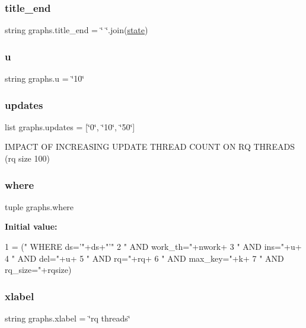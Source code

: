 \subsubsection{\texorpdfstring{title\+\_\+end}{title\_end}}
{\footnotesize\ttfamily string graphs.\+title\+\_\+end = \char`\"{} \char`\"{}.join(\hyperlink{namespacegraphs_a7e28b4b5f2a57b0c7edebb674233cf1e}{state})}

\mbox{\label{namespacegraphs_aebc3e1c4f83749bafa0b9caba4731c50}} 
\subsubsection{\texorpdfstring{u}{u}}
{\footnotesize\ttfamily string graphs.\+u = \char`\"{}10\char`\"{}}

\mbox{\label{namespacegraphs_a222bd6a58314240f5bd2dea29ef99ea2}} 
\subsubsection{\texorpdfstring{updates}{updates}}
{\footnotesize\ttfamily list graphs.\+updates = \mbox{[}\char`\"{}0\char`\"{}, \char`\"{}10\char`\"{}, \char`\"{}50\char`\"{}\mbox{]}}



I\+M\+P\+A\+CT OF I\+N\+C\+R\+E\+A\+S\+I\+NG U\+P\+D\+A\+TE T\+H\+R\+E\+AD C\+O\+U\+NT ON RQ T\+H\+R\+E\+A\+DS (rq size 100) 

\mbox{\label{namespacegraphs_a3f641a99f0d63776af3f7bf756acb657}} 
\subsubsection{\texorpdfstring{where}{where}}
{\footnotesize\ttfamily tuple graphs.\+where}

{\bfseries Initial value\+:}
\begin{DoxyCode}
1 =  (\textcolor{stringliteral}{" WHERE ds='"}+ds+\textcolor{stringliteral}{"'"}
2                     \textcolor{stringliteral}{" AND work\_th="}+nwork+
3                     \textcolor{stringliteral}{" AND ins="}+u+
4                     \textcolor{stringliteral}{" AND del="}+u+
5                     \textcolor{stringliteral}{" AND rq="}+rq+ 
6                     \textcolor{stringliteral}{" AND max\_key="}+k+
7                     \textcolor{stringliteral}{" AND rq\_size="}+rqsize)
\end{DoxyCode}
\mbox{\label{namespacegraphs_a13b5142f4c941140bcf3b2caf04f39b5}} 
\subsubsection{\texorpdfstring{xlabel}{xlabel}}
{\footnotesize\ttfamily string graphs.\+xlabel = \char`\"{}rq threads\char`\"{}}


